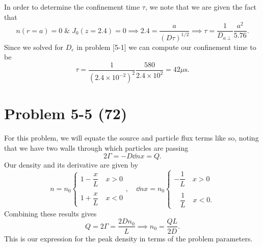 In order to determine the confinement time \(\tau \), we note that we are given the fact that
\begin{equation*}
	n(r=a) = 0 \;\&\; J_0(z = 2.4) = 0 \implies 2.4 = \dfrac{a}{(D\tau)^{1/2}} \implies \tau = \dfrac{1}{D_{a\perp}}\dfrac{a^2}{5.76}.
\end{equation*}
Since we solved for \(D_e\) in problem [5-1] we can compute our confinement time to be
\begin{equation*}
	\tau = \dfrac{1}{(2.4\times 10^{-2})^2}\dfrac{580}{2.4\times 10^2} = 42\mu\text{s}.
\end{equation*}

\section*{Problem 5-5 (72)}
\label{sec:5-5}
For this problem, we will equate the source and particle flux terms like so, noting that we have two walls through which particles are passing
\begin{equation*}
	2\Gamma = -D\dd{n}{x} = Q.
\end{equation*}
Our density and its derivative are given by
\begin{equation*}
	n = n_0\begin{cases}
	1 - \dfrac{x}{L} \quad x > 0 \\
	\\
	1 + \dfrac{x}{L} \quad x < 0 
	\end{cases}, \quad 
	\dd{n}{x} = n_0\begin{cases}
	 - \dfrac{1}{L} \quad x > 0 \\
	\\
	\;\;\;\dfrac{1}{L} \quad x < 0 .
	\end{cases}
\end{equation*}
Combining these results gives 
\begin{equation*}
	Q = 2\Gamma = \dfrac{2Dn_0}{L} \implies n_0 = \dfrac{QL}{2D}.
\end{equation*}
This is our expression for the peak density in terms of the problem parameters.

